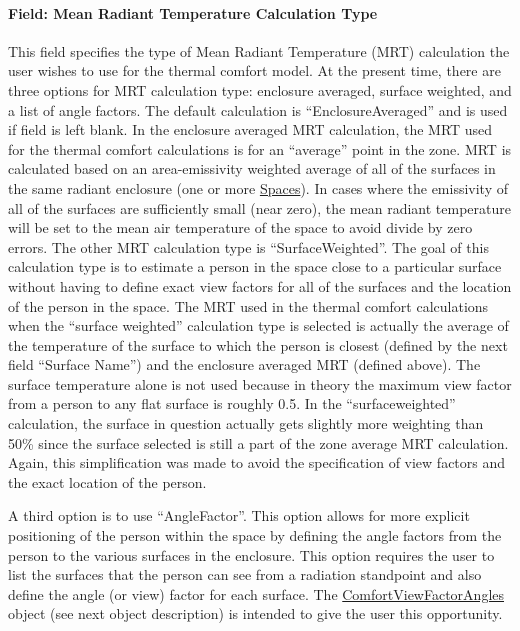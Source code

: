 \paragraph{Field: Mean Radiant Temperature Calculation Type}\label{field-mean-radiant-temperature-calculation-type}

This field specifies the type of Mean Radiant Temperature (MRT) calculation the user wishes to use for the thermal comfort model. At the present time, there are three options for MRT calculation type: enclosure averaged, surface weighted, and a list of angle factors. The default calculation is ``EnclosureAveraged'' and is used if field is left blank. In the enclosure averaged MRT calculation, the MRT used for the thermal comfort calculations is for an ``average'' point in the zone. MRT is calculated based on an area-emissivity weighted average of all of the surfaces in the same radiant enclosure (one or more \hyperref[space]{Spaces}). In cases where the emissivity of all of the surfaces are sufficiently small (near zero), the mean radiant temperature will be set to the mean air temperature of the space to avoid divide by zero errors. The other MRT calculation type is ``SurfaceWeighted''. The goal of this calculation type is to estimate a person in the space close to a particular surface without having to define exact view factors for all of the surfaces and the location of the person in the space. The MRT used in the thermal comfort calculations when the ``surface weighted'' calculation type is selected is actually the average of the temperature of the surface to which the person is closest (defined by the next field ``Surface Name'') and the enclosure averaged MRT (defined above). The surface temperature alone is not used because in theory the maximum view factor from a person to any flat surface is roughly 0.5. In the ``surfaceweighted'' calculation, the surface in question actually gets slightly more weighting than 50\% since the surface selected is still a part of the zone average MRT calculation. Again, this simplification was made to avoid the specification of view factors and the exact location of the person.

A third option is to use ``AngleFactor''. This option allows for more explicit positioning of the person within the space by defining the angle factors from the person to the various surfaces in the enclosure. This option requires the user to list the surfaces that the person can see from a radiation standpoint and also define the angle (or view) factor for each surface. The \hyperref[comfortviewfactorangles]{ComfortViewFactorAngles} object (see next object description) is intended to give the user this opportunity.

